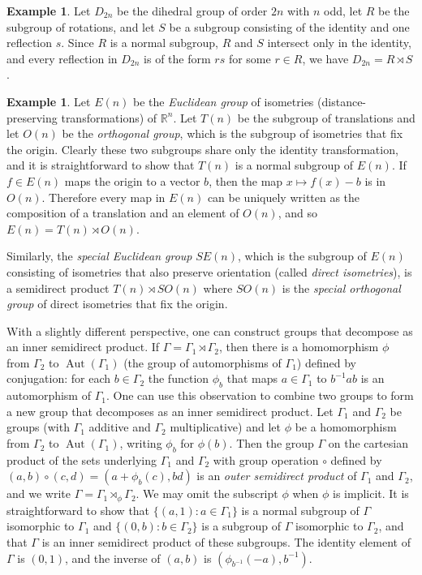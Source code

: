 \documentclass[12pt]{article}
\theoremstyle{definition}
\newtheorem{example}[theorem]{Example}
\newcommand{\bR}{\mathbb R}
\DeclareMathOperator{\Aut}{Aut}
\begin{document}
\begin{example}
Let $D_{2n}$ be the dihedral group of order $2n$ with $n$ odd, let $R$ be the subgroup of rotations, and let $S$ be a subgroup consisting of the identity and one reflection $s$.
Since $R$ is a normal subgroup, $R$ and $S$ intersect only in the identity, and every reflection in $D_{2n}$ is of the form $rs$ for some $r \in R$, we have $D_{2n} = R \rtimes S$. 
\end{example}





\begin{example} \label{ex: Euclidean group as semidirect product}
Let $E(n)$ be the \emph{Euclidean group} of isometries (distance-preserving transformations) of $\bR^n$.
Let $T(n)$ be the subgroup of translations and let $O(n)$ be the \emph{orthogonal group}, which is the subgroup of isometries that fix the origin.
Clearly these two subgroups share only the identity transformation, and 
it is straightforward to show that $T(n)$ is a normal subgroup of $E(n)$.
If $f \in E(n)$ maps the origin to a vector $b$, then the map $x \mapsto f(x) - b$ is in $O(n)$.
Therefore every map in $E(n)$ can be uniquely written as the composition of a translation and an element of $O(n)$, and so $E(n) = T(n) \rtimes O(n)$.


Similarly, the \emph{special Euclidean group} $SE(n)$, which is the subgroup of $E(n)$ consisting of isometries that also preserve orientation (called \emph{direct isometries}), is a semidirect product $T(n)\rtimes SO(n)$ where $SO(n)$ is the \emph{special orthogonal group} of direct isometries that fix the origin.
\end{example}




With a slightly different perspective, one can construct groups that decompose as an inner semidirect product.
If $\Gamma = \Gamma_1 \rtimes \Gamma_2$, then there is a homomorphism $\phi$ from $\Gamma_2$ to $\Aut(\Gamma_1)$ (the group of automorphisms of $\Gamma_1$) defined by conjugation: for each $b \in \Gamma_2$ the function $\phi_b$ that maps $a \in \Gamma_1$ to $b^{-1}ab$ is an automorphism of $\Gamma_1$.
One can use this observation to combine two groups to form a new group that decomposes as an inner semidirect product.
Let $\Gamma_1$ and $\Gamma_2$ be groups (with $\Gamma_1$ additive and $\Gamma_2$ multiplicative) and let $\phi$ be a homomorphism from $\Gamma_2$ to $\Aut(\Gamma_1)$, writing $\phi_b$ for $\phi(b)$.
Then the group $\Gamma$ on the cartesian product of the sets underlying $\Gamma_1$ and $\Gamma_2$ with group operation $\circ$ defined by $(a, b) \circ (c, d) = (a + \phi_b(c), bd)$ is an \emph{outer semidirect product} of $\Gamma_1$ and $\Gamma_2$, and we write $\Gamma = \Gamma_1 \rtimes_{\phi} \Gamma_2$.
We may omit the subscript $\phi$ when $\phi$ is implicit.
It is straightforward to show that $\{(a, 1) \colon a \in \Gamma_1\}$ is a normal subgroup of $\Gamma$ isomorphic to $\Gamma_1$ and $\{(0, b) \colon b \in \Gamma_2\}$ is a subgroup of $\Gamma$ isomorphic to $\Gamma_2$, and that $\Gamma$ is an inner semidirect product of these subgroups.
The identity element of $\Gamma$ is $(0, 1)$, and the inverse of $(a, b)$ is $(\phi_{b^{-1}}(-a), b^{-1})$.
\end{document}
